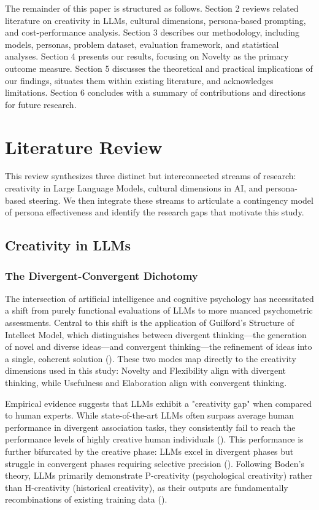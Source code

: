 \documentclass{article}
\begin{document}
The remainder of this paper is structured as follows. Section 2 reviews related literature on creativity in LLMs, cultural dimensions, persona-based prompting, and cost-performance analysis. Section 3 describes our methodology, including models, personas, problem dataset, evaluation framework, and statistical analyses. Section 4 presents our results, focusing on Novelty as the primary outcome measure. Section 5 discusses the theoretical and practical implications of our findings, situates them within existing literature, and acknowledges limitations. Section 6 concludes with a summary of contributions and directions for future research.

\section{Literature Review}

This review synthesizes three distinct but interconnected streams of research: creativity in Large Language Models, cultural dimensions in AI, and persona-based steering. We then integrate these streams to articulate a contingency model of persona effectiveness and identify the research gaps that motivate this study.

\subsection{Creativity in LLMs}

\subsubsection{The Divergent-Convergent Dichotomy}

The intersection of artificial intelligence and cognitive psychology has necessitated a shift from purely functional evaluations of LLMs to more nuanced psychometric assessments. Central to this shift is the application of Guilford's Structure of Intellect Model, which distinguishes between divergent thinking—the generation of novel and diverse ideas—and convergent thinking—the refinement of ideas into a single, coherent solution (\cite{vikram_arora_67282d96, harsh_kumar_84fce084}). These two modes map directly to the creativity dimensions used in this study: Novelty and Flexibility align with divergent thinking, while Usefulness and Elaboration align with convergent thinking.

Empirical evidence suggests that LLMs exhibit a "creativity gap" when compared to human experts. While state-of-the-art LLMs often surpass average human performance in divergent association tasks, they consistently fail to reach the performance levels of highly creative human individuals (\cite{antoine_bellemare_pepin_a5621579}). This performance is further bifurcated by the creative phase: LLMs excel in divergent phases but struggle in convergent phases requiring selective precision (\cite{harsh_kumar_84fce084}). Following Boden's theory, LLMs primarily demonstrate P-creativity (psychological creativity) rather than H-creativity (historical creativity), as their outputs are fundamentally recombinations of existing training data (\cite{vikram_arora_67282d96, harsh_kumar_84fce084}).
\end{document}
